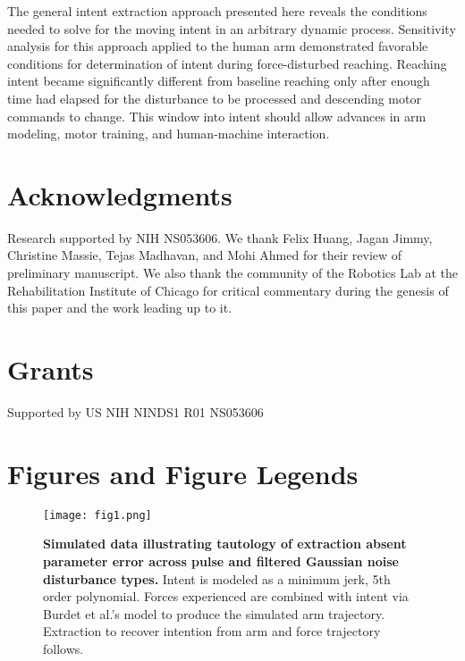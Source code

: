 \documentclass[10pt]{article}
\begin{document}
The general intent extraction approach presented here reveals the conditions needed to solve for the moving intent in an arbitrary dynamic process. Sensitivity analysis for this approach applied to the human arm demonstrated favorable conditions for determination of intent during force-disturbed reaching. Reaching intent became significantly different from baseline reaching only after enough time had elapsed for the disturbance to be processed and descending motor commands to change. This window into intent should allow advances in arm modeling, motor training, and human-machine interaction.

\section*{Acknowledgments}
Research supported by NIH NS053606.  We thank Felix Huang, Jagan Jimmy, Christine Massie, Tejas Madhavan, and Mohi Ahmed for their review of preliminary manuscript. We also thank the community  of the Robotics Lab at the Rehabilitation Institute of Chicago for critical commentary during the genesis of this paper and the work leading up to it.
 
\section*{Grants} 
Supported by US NIH NINDS1 R01 NS053606



\pagebreak
\section*{Figures and Figure Legends}
\begin{figure}[!ht]
\begin{center}
\texttt{[image: fig1.png]}
\end{center}
\caption{
{\bf Simulated data illustrating tautology of extraction absent parameter error across pulse and filtered Gaussian noise disturbance types.} Intent is modeled as a minimum jerk, 5th order polynomial. Forces experienced are combined with intent via Burdet et al.'s \cite{burdet2006stability} model to produce the simulated arm trajectory. Extraction to recover intention from arm and force trajectory follows.
}
\label{fig:synthetic}
\end{figure}
\end{document}

